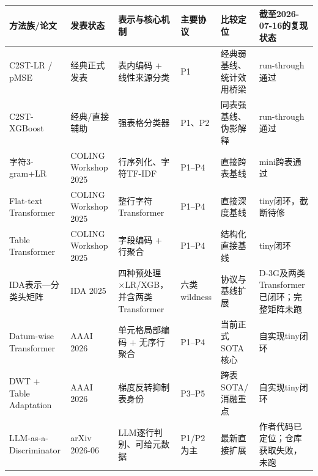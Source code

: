 \documentclass[
  chinese,
  12pt,
  a4paper,
  chinese,
  UTF8]{ctexart}
\begin{document}
\begin{longtable}[]{@{}
  >{\raggedright\arraybackslash}p{}
  >{\raggedright\arraybackslash}p{}
  >{\raggedright\arraybackslash}p{}
  >{\raggedright\arraybackslash}p{}
  >{\raggedright\arraybackslash}p{}
  >{\raggedright\arraybackslash}p{}@{}}
\toprule\noalign{}
\begin{minipage}[b]{\linewidth}\raggedright
方法族/论文
\end{minipage} & \begin{minipage}[b]{\linewidth}\raggedright
发表状态
\end{minipage} & \begin{minipage}[b]{\linewidth}\raggedright
表示与核心机制
\end{minipage} & \begin{minipage}[b]{\linewidth}\raggedright
主要协议
\end{minipage} & \begin{minipage}[b]{\linewidth}\raggedright
比较定位
\end{minipage} & \begin{minipage}[b]{\linewidth}\raggedright
截至2026-07-16的复现状态
\end{minipage} \\
\midrule\noalign{}
\endhead
\bottomrule\noalign{}
\endlastfoot
C2ST-LR / pMSE & 经典正式发表 & 表内编码 + 线性来源分类 & P1 &
经典弱基线、统计效用桥梁 & run-through通过 \\
C2ST-XGBoost & 经典/直接辅助 & 强表格分类器 & P1、P2 &
同表强基线、伪影解释 & run-through通过 \\
字符3-gram+LR & COLING Workshop 2025 & 行序列化、字符TF-IDF & P1--P4 &
直接跨表基线 & mini跨表通过 \\
Flat-text Transformer & COLING Workshop 2025 & 整行字符Transformer &
P1--P4 & 直接深度基线 & tiny闭环，截断待修 \\
Table Transformer & COLING Workshop 2025 & 字段编码 + 行聚合 & P1--P4 &
结构化直接基线 & tiny闭环 \\
IDA表示---分类头矩阵 & IDA 2025 & 四种预处理×LR/XGB，并含两类Transformer
& 六类wildness & 协议与基线扩展 &
D-3G及两类Transformer已闭环；完整矩阵未跑 \\
Datum-wise Transformer & AAAI 2026 & 单元格局部编码 + 无序行聚合 &
P1--P4 & 当前正式SOTA核心 & 自实现tiny闭环 \\
DWT + Table Adaptation & AAAI 2026 & 梯度反转抑制表身份 & P3--P5 &
跨表SOTA/消融重点 & 自实现tiny闭环 \\
LLM-as-a-Discriminator & arXiv 2026-06 & LLM逐行判别、可给元数据 &
P1/P2为主 & 最新直接扩展 & 作者代码已定位；仓库获取失败，未跑 \\
\end{longtable}
\end{document}
